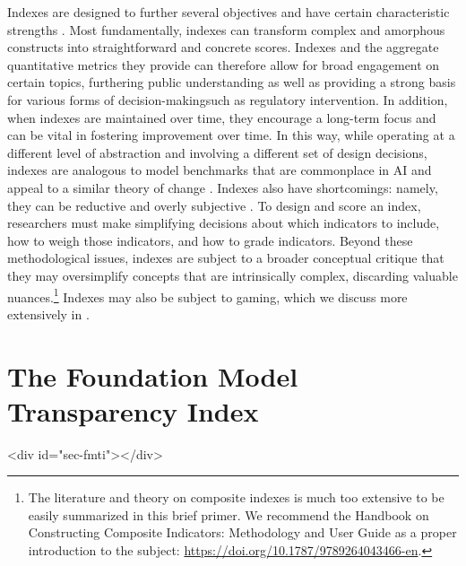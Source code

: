 \documentclass[screen, authorversion, acmsmall]{acmart}
\begin{document}
Indexes are designed to further several objectives and have certain characteristic strengths \citep{joint2008handbook, saisana2002state}. 
Most fundamentally, indexes can transform complex and amorphous constructs into straightforward and concrete scores.
Indexes and the aggregate quantitative metrics they provide can therefore allow for broad engagement on certain topics, furthering public understanding as well as providing a strong basis for various forms of decision-makingsuch as regulatory intervention. 
In addition, when indexes are maintained over time, they encourage a long-term focus and can be vital in fostering improvement over time.
In this way, while operating at a different level of abstraction and involving a different set of design decisions, indexes are analogous to model benchmarks that are commonplace in AI \citep{deng2009imagenet, wang2019superglue, liang2023holistic} and appeal to a similar theory of change \citep{donoho2017fifty, ethayarajh2020utility, raji2021benchmark, bommasani2022evaluation}.
Indexes also have shortcomings: namely, they can be reductive and overly subjective \citep{saisana2002state, oecd2008handbook, greco2019methodological}.
To design and score an index, researchers must make simplifying decisions about which indicators to include, how to weigh those indicators, and how to grade indicators.
Beyond these methodological issues, indexes are subject to a broader conceptual critique that they may oversimplify concepts that are intrinsically complex, discarding valuable nuances.\footnote{The literature and theory on composite indexes is much too extensive to be easily summarized in this brief primer.
We recommend the Handbook on Constructing Composite Indicators: Methodology and User Guide \citep{oecd2008handbook} as a proper introduction to the subject: \url{https://doi.org/10.1787/9789264043466-en}.} 
Indexes may also be subject to gaming, which we discuss more extensively in .
\clearpage

\hypertarget{fmti}{\section{The Foundation Model Transparency Index}}
<div id="sec-fmti"></div>
\end{document}
